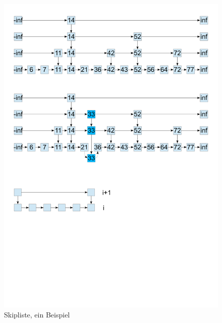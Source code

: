 \documentclass[a4paper,twoside,10pt]{report}
\begin{document}
\begin{figure}[H]\center
\includegraphics[trim= .9cm 22cm .9cm 1cm,clip,width=\columnwidth]{figures/skiplist.pdf}
\caption{Skipliste, ein Beispiel}
\end{figure}
\end{document}
